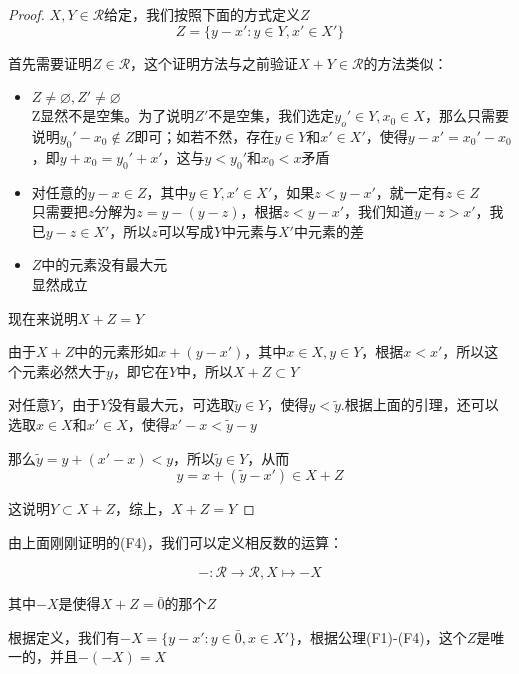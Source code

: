 \begin{proof}
    $X,Y\in\mathcal{R}$给定，我们按照下面的方式定义$Z$
    \begin{equation*}
        Z=\{y-x':y\in Y,x' \in X' \}
    \end{equation*}

    首先需要证明$Z\in \mathcal{R}$，这个证明方法与之前验证$X+Y\in\mathcal{R}$的方法类似：

    \begin{itemize}
        \item $Z\neq \varnothing,Z' \neq \varnothing$ \\
        Z显然不是空集。为了说明$Z'$不是空集，我们选定$y_o'\in Y,x_0\in X$，那么只需要说明$y_0'-x_0\notin Z$即可；如若不然，存在$y\in Y$和$x'\in X'$，使得$y-x' = x_0'-x_0$，即$y+x_0=y_0'+x'$，这与$y<y_0'$和$x_0<x$矛盾
        \item 对任意的$y-x\in Z$，其中$y\in Y,x'\in X'$，如果$z<y-x'$，就一定有$z\in Z$\\
        只需要把$z$分解为$z=y-(y-z)$，根据$z<y-x'$，我们知道$y-z>x'$，我已$y-z\in X'$，所以$z$可以写成$Y$中元素与$X'$中元素的差
        \item $Z$中的元素没有最大元\\
        显然成立
    \end{itemize}

    现在来说明$X+Z=Y$

    由于$X+Z$中的元素形如$x+(y-x')$，其中$x\in X,y\in Y$，根据$x<x'$，所以这个元素必然大于$y$，即它在$Y$中，所以$X+Z\subset Y$

    对任意$Y$，由于$Y$没有最大元，可选取$\tilde{y}\in Y$，使得$y<\tilde{y}$.根据上面的引理，还可以选取$x\in X$和$x' \in X$，使得$x'-x<\tilde{y}-y$

    那么$\tilde{y}=y+(x'-x)<y$，所以$\tilde{y}\in Y$，从而
    \begin{equation*}
        y=x+(\tilde{y}-x')\in X+Z 
    \end{equation*}

    这说明$Y\subset X+Z$，综上，$X+Z=Y$
\end{proof}

由上面刚刚证明的(F4)，我们可以定义相反数的运算：

\begin{equation*}
    -:\mathcal{R}\rightarrow\mathcal{R},X\mapsto -X
\end{equation*}

其中$-X$是使得$X+Z=\bar{0}$的那个$Z$

根据定义，我们有$-X=\{y-x':y\in \bar{0},x\in X'\}$，根据公理(F1)-(F4)，这个$Z$是唯一的，并且$-(-X)=X$

